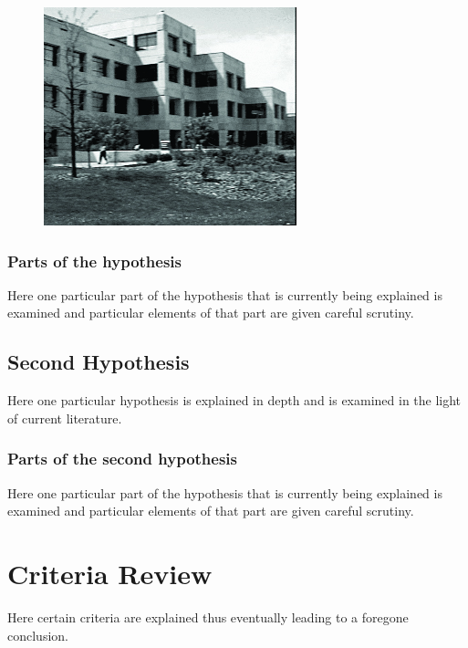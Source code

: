 \begin{figure}[h!tb] \centering

\includegraphics[alt={Picture of Durham you know}]{Images/dc5}

\label{mgraph}
\end{figure}

\subsubsection{Parts of the hypothesis}

Here one particular part of the hypothesis that is 
currently being explained is examined and particular
elements of that part are given careful scrutiny.


\subsection{Second Hypothesis}

Here one particular hypothesis is explained in depth
and is examined in the light of current literature.

\subsubsection{Parts of the second hypothesis}

Here one particular part of the hypothesis that is 
currently being explained is examined and particular
elements of that part are given careful scrutiny.

\section{Criteria Review}

Here certain criteria are explained thus eventually
leading to a foregone conclusion.
